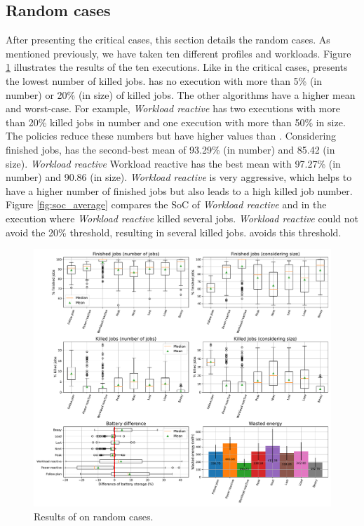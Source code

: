 \clearpage

\subsection{Random cases}

After presenting the critical cases, this section details the random cases. As mentioned previously, we have taken ten different profiles and workloads. Figure \ref{fig:beasy_average} illustrates the results of the ten executions. Like in the critical cases, \emph{\systemName} presents the lowest number of killed jobs. \emph{\systemName} has no execution with more than 5\% (in number) or 20\% (in size) of killed jobs. The other algorithms have a higher mean and worst-case. For example, \emph{Workload reactive} has two executions with more than 20\% killed jobs in number and one execution with more than 50\% in size. The policies reduce these numbers but have higher values than \emph{\systemName}. Considering finished jobs, \emph{\systemName} has the second-best mean of 93.29\% (in number) and 85.42 (in size). \emph{Workload reactive} Workload reactive has the best mean with 97.27\% (in number) and 90.86 (in size). \emph{Workload reactive} is very aggressive, which helps to have a higher number of finished jobs but also leads to a high killed job number. Figure \ref{fig:soc_average} compares the SoC of \emph{Workload reactive} and \emph{\systemName} in the execution where \emph{Workload reactive} killed several jobs. \emph{Workload reactive} could not avoid the 20\% threshold, resulting in several killed jobs. \emph{\systemName} avoids this threshold.

\begin{figure}[!htb]
    \centering
    \includegraphics[scale=0.39]{Images/Heuristic/100_cases.pdf}
    \caption{Results of \emph{\systemName} on random cases.}
    \label{fig:beasy_average}
\end{figure}

